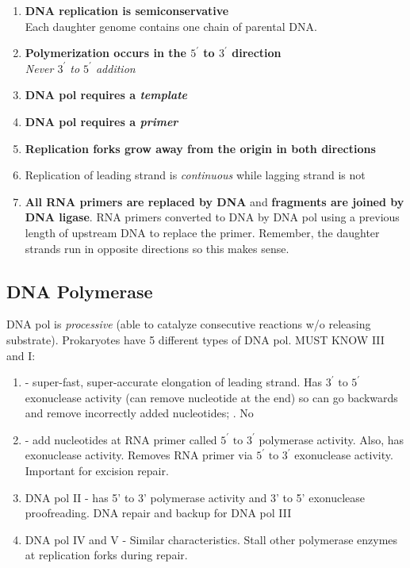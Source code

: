 \documentclass[../Bio_chemistryReview.tex]{subfiles}
\begin{document}
\begin{enumerate}
  \item \textbf{DNA replication is semiconservative}\\
    Each daughter genome contains one chain of parental DNA.
  \item \textbf{Polymerization occurs in the $ 5^{\prime} $ to $ 3^{\prime} $ direction}\\
    \emph{Never $ 3^{\prime} $ to $ 5^{\prime} $ addition} 
  \item \textbf{DNA pol requires a \emph{template}}
  \item \textbf{DNA pol requires a \emph{primer}}
  \item \textbf{Replication forks grow away from the origin in both directions}
  \item Replication of leading strand is \emph{continuous} while lagging strand
    is not 
  \item \textbf{All RNA primers are replaced by DNA} and \textbf{fragments are
    joined by DNA ligase}. RNA primers converted to DNA by DNA pol using a
    previous length of upstream DNA to replace the primer. Remember, the
    daughter strands run in opposite directions so this makes sense.
\end{enumerate}

\subsection{DNA Polymerase}

DNA pol is \emph{processive} (able to catalyze consecutive reactions w/o
releasing substrate). Prokaryotes have 5 different types of DNA pol. MUST KNOW
III and I: 
\begin{enumerate}
  \item {} - super-fast, super-accurate elongation of
    leading strand. Has $ 3^{\prime} \text{ to } 5^{\prime} $ exonuclease
    activity (can remove nucleotide at the end) so can go backwards and
    remove incorrectly added nucleotides; . No   
  \item {} - add nucleotides at RNA primer called $ 5^{\prime}
    \text{ to } 3^{\prime} $ polymerase activity. Also, has exonuclease
    activity. Removes RNA primer via $ 5^{\prime} \text{ to } 3^{\prime} $
    exonuclease activity. Important for excision repair.  
  \item DNA pol II - has 5' to 3' polymerase activity and 3' to 5' exonuclease
    proofreading.  DNA repair and backup for DNA pol III 
  \item DNA pol IV and V - Similar characteristics. Stall other polymerase
    enzymes at replication forks during repair.
\end{enumerate}
\end{document}
